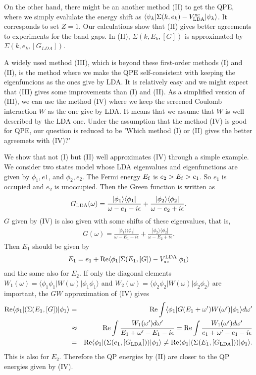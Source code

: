 \documentclass[a4paper,10pt,epsf,fleqn]{article}
\begin{document}
On the other hand, there might be an another method (II)
to get the QPE, where we simply evalulate the energy shift as
$\langle \psi_{k}| \Sigma(k, e_k) - V^{\rm xc}_{\rm LDA}| \psi_{k} \rangle$.
It corresponds to set $Z=1$.
Our calculations show that (II) gives better agreements
to experiments for the band gaps.
In (II), $\Sigma(k, E_k, [G])$ 
is approximated by $\Sigma(k, e_k, [G_{LDA}])$.

A widely used method (III), which is beyond these first-order methods (I) and (II),
is the method where we make the QPE self-consistent
with keeping the eigenfuncions as the ones give by LDA.
It is relatively easy and we might expect that
(III) gives some improvements than (I) and (II).
As a simplified version of (III), we can use the method (IV)
where we keep the screened Coulomb interaction $W$ as the one give by LDA.
It means that we assume that $W$ is well described by the LDA one.
Under the assumption that the method (IV) is good for QPE,
our question is reduced to be
'Which method (I) or (II) gives the better agreemets with (IV)?'

We show that not (I) but (II) well approximates (IV)
through a simple example.
We consider two states model whose LDA eigenvalues and eigenfunctions
are given by $\phi_1,e1$, and $\phi_2,e_2$.
The Fermi energy $E_{\rm f}$ is $e_2>E_{\rm f}>e_1 $. So $e_1$ is occupied and
$e_2$ is unoccupied. Then the Green function is written as
\begin{eqnarray}
G_{\rm LDA}(\omega) =   \frac{|\phi_1\rangle\langle\phi_1|}{\omega - e_1 -i\epsilon}
          + \frac{|\phi_2\rangle\langle\phi_2|}{\omega - e_2 +i\epsilon}.
\end{eqnarray}
$G$ given by (IV) is also given with some shifts of 
these eigenvalues, that is,
\begin{eqnarray}
G(\omega) =   \frac{|\phi_1\rangle\langle\phi_1|}{\omega - E_1 -i\epsilon}
            + \frac{|\phi_2\rangle\langle\phi_2|}{\omega - E_2 +i\epsilon}.
\end{eqnarray}
Then $E_1$ should be given by
\begin{eqnarray}
E_1 = e_1 + {\rm Re}\langle\phi_1|\Sigma(E_1,[G])- V^{\rm LDA}_{\rm xc}|\phi_1\rangle
\end{eqnarray}
and the same also for $E_2$.
If only the diagonal elements
$W_1(\omega)=\langle\phi_1 \phi_1|W(\omega) |\phi_1 \phi_1\rangle$
and $W_2(\omega)=\langle\phi_2 \phi_2|W(\omega) |\phi_2 \phi_2\rangle$
are important, the $GW$ approximation of (IV) gives
\begin{eqnarray*}
{\rm Re} \langle\phi_1|(\Sigma(E_1,[G])|\phi_1\rangle
&=& {\rm Re} \int \langle\phi_1| G(E_1+\omega') W(\omega')|\phi_1\rangle d \omega'\\
&\approx& {\rm Re} \int \frac{W_1(\omega') d \omega'}{E_1 + \omega' - E_1 -i\epsilon} 
= {\rm Re} \int \frac{W_1(\omega') d \omega'}{e_1 + \omega' - e_1 -i\epsilon} \\
&=& {\rm Re} \langle\phi_1|(\Sigma(e_1,[G_{\rm LDA}]))|\phi_1\rangle
\neq {\rm Re} \langle\phi_1|(\Sigma(E_1,[G_{\rm LDA}]))|\phi_1\rangle.
\end{eqnarray*}
This is also for $E_2$. Therefore the QP energies by (II)
are closer to the QP energies given by (IV).
\end{document}
